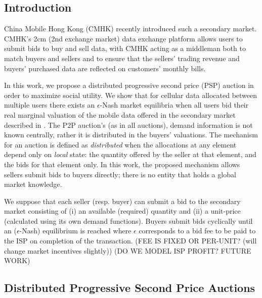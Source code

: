 \documentclass[12pt]{article}
\theoremstyle{definition}
\begin{document}
\begin{multicols}{2}

\section{Introduction}
China Mobile Hong Kong (CMHK) recently introduced such a secondary market.
CMHK’s 2cm (2nd exchange market) data exchange platform allows users to submit
bids to buy and sell data, with CMHK acting as a middleman both to match buyers
and sellers and to ensure that the sellers’ trading revenue and buyers’
purchased data are reflected on customers’ monthly bills. \cite{zheng}

In this work, we propose a distributed progressive second price (PSP) auction in
order to maximize social utility. We show that for cellular data allocated between multiple users there
exists an $\epsilon$-Nash market equilibria when all users bid their real marginal
valuation of the mobile data offered in the secondary market described in
\cite{zheng}. The P2P auction's (as in all auctions),
demand information is not known centrally, rather it is distributed in the
buyers' valuations. The mechanism for an auction is defined
as \emph{distributed} when the allocations at any element depend only on
\emph{local} state: the quantity offered by the seller at that element, and the
bids for that element only. In this work, the proposed mechanism allows sellers submit bids to buyers
directly; there is no entity that holds a global market knowledge.

We suppose that each seller (resp. buyer) can submit a bid to the secondary
market consisting of (i) an available (required) quantity and (ii) a unit-price (calculated
using its own demand functions). Buyers submit bids cyclically until an
($\epsilon$-Nash) equilibrium is reached where $\epsilon$ corresponds to a bid
fee to be paid to the ISP on completion of the transaction. (FEE IS FIXED OR
PER-UNIT? (will change market incentives slightly))
(DO WE MODEL ISP PROFIT? FUTURE WORK)

\subsection{Distributed Progressive Second Price Auctions}


\end{multicols}
\end{document}
